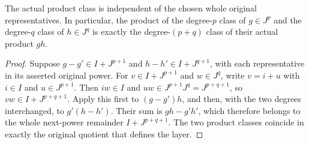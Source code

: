 \begin{lemma}
\label{hir:relative-normal-intrinsic-layer-product-independent}
\leanok
{}
The actual product class is independent of the chosen whole original
representatives. In particular, the product of the degree-$p$ class of
$g\in J^p$ and the degree-$q$ class of $h\in J^q$ is exactly the
degree-$(p+q)$ class of their actual product $gh$.
\end{lemma}
\begin{proof}
Suppose $g-g'\in I+J^{p+1}$ and $h-h'\in I+J^{q+1}$, with each
representative in its asserted original power. For $v\in I+J^{p+1}$
and $w\in J^q$, write $v=i+u$ with $i\in I$ and
$u\in J^{p+1}$. Then $iw\in I$ and
$uw\in J^{p+1}J^q=J^{p+q+1}$, so
$vw\in I+J^{p+q+1}$. Apply this first to $(g-g')h$, and then,
with the two degrees interchanged, to $g'(h-h')$. Their sum is
$gh-g'h'$, which therefore belongs to the whole next-power remainder
$I+J^{p+q+1}$. The two product classes coincide in exactly the original
quotient that defines the layer.
\end{proof}

